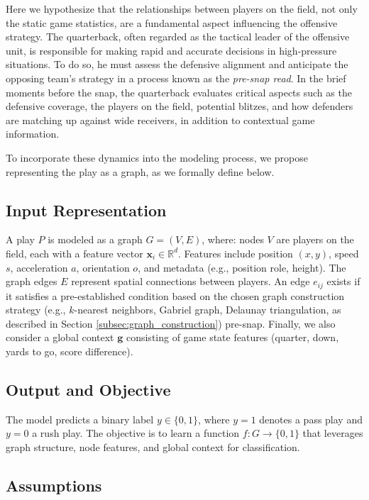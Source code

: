 \documentclass[runningheads]{llncs}
\begin{document}
Here we hypothesize that the relationships between players on the field, not only the static game statistics, are a fundamental aspect influencing the offensive strategy. The quarterback, often regarded as the tactical leader of the offensive unit, is responsible for making rapid and accurate decisions in high-pressure situations. To do so, he must assess the defensive alignment and anticipate the opposing team’s strategy in a process known as the \textit{pre-snap read}. In the brief moments before the snap, the quarterback evaluates critical aspects such as the defensive coverage, the players on the field, potential blitzes, and how defenders are matching up against wide receivers, in addition to contextual game information.

To incorporate these dynamics into the modeling process, we propose representing the play as a graph, as we formally define below.

\subsection{Input Representation}
A play \( P \) is modeled as a graph \( G = (V, E) \), where: nodes \( V \) are players on the field, each with a feature vector \( \mathbf{x}_i \in \mathbb{R}^d \). Features include position \((x, y)\), speed \( s \), acceleration \( a \), orientation \( o \), and metadata (e.g., position role, height). The graph edges \( E \) represent spatial connections between players. An edge \( e_{ij} \) exists if it satisfies a pre-established condition based on the chosen graph construction strategy (e.g., \( k \)-nearest neighbors, Gabriel graph, Delaunay triangulation, as described in Section \ref{subsec:graph_construction}) pre-snap. Finally, we also consider a global context \( \mathbf{g} \) consisting of game state features (quarter, down, yards to go, score difference).

\subsection{Output and Objective}
The model predicts a binary label \( y \in \{0, 1\} \), where \( y = 1 \) denotes a pass play and \( y = 0 \) a rush play. The objective is to learn a function \( f: G \rightarrow \{0, 1\} \) that leverages graph structure, node features, and global context for classification.

\subsection{Assumptions}
\end{document}
